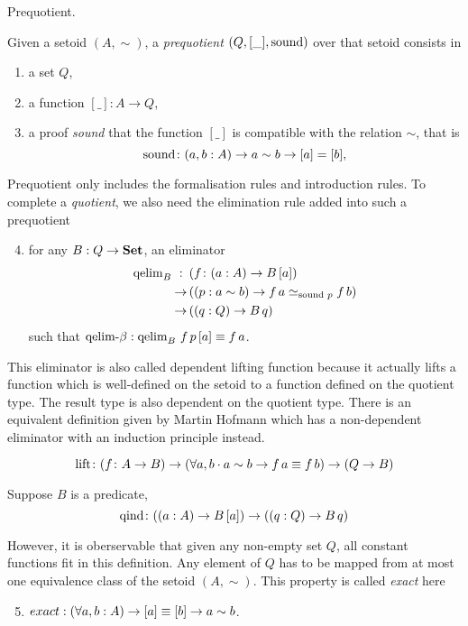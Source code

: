 \begin{definition}
Prequotient.

\noindent
Given a setoid $(A,\sim)$,  a \emph{prequotient} $(Q,[\_],\operatorname{sound})$ over that setoid consists in
\begin{enumerate}
\item \label{enum:Q} a set $Q$,
\item \label{enum:box}a function $[\_]: A \rightarrow Q$,
\item \label{enum:sound} a proof \emph{sound} that  the function $[\_]$ is compatible with the relation $\sim$,
that is \[\operatorname{sound}\colon (a,b : A) \rightarrow a\sim b \rightarrow [a] = [b],\]
\end{enumerate}


Prequotient only includes the formalisation rules and introduction
rules. To complete a \emph{quotient}, we also need the elimination rule added into such a prequotient

\begin{enumerate}
\setcounter{enumi}{3}
\item \label{enum:elim}
for any $B: Q\rightarrow\operatorname{\mathbf{Set}}$, an eliminator
 \begin{align*}
 \operatorname{qelim}_B\,\,:\,\,\,&(f\colon (a:A) \rightarrow B\,[a]) \\
        {\rightarrow}\, &((p:a\sim b) \rightarrow f\,a \simeq_{\operatorname{sound}\,p}f\,b)\\
        {\rightarrow}\, &((q:Q) \rightarrow B\,q)
 \end{align*}
such that $\operatorname{qelim-\beta} : \operatorname{qelim}_B\,f \,p\,[a]\equiv f\,a$.
\end{enumerate}

This eliminator is also called dependent lifting function because it
actually lifts a function which is well-defined on the setoid to a
function defined on the quotient type. The result type is also
dependent on the quotient type. There is an equivalent definition
given by Martin Hofmann
which has a non-dependent eliminator with an induction principle
instead.

\[\operatorname{lift}\colon (f\colon A \rightarrow B) \rightarrow (\forall a,b\cdot a\sim b \rightarrow f\,a
\equiv f\,b) \rightarrow (Q \rightarrow B)\]

Suppose $B$ is a predicate, 
\[\operatorname{qind} \colon((a: A)\rightarrow B \,[a])\rightarrow ((q : Q)\rightarrow B\,q)\]

However, it is oberservable that given any non-empty set $Q$, all
constant functions fit in this definition. Any element of $Q$ has to
be mapped from at most one equivalence class of the setoid
$(A,\sim)$. This property is called \emph{exact} here 

\begin{enumerate}
\setcounter{enumi}{4}
\item $exact :(\forall a,b : A) \rightarrow  [a] \equiv [b] \rightarrow a \sim b$.

\end{enumerate}
\end{definition}

